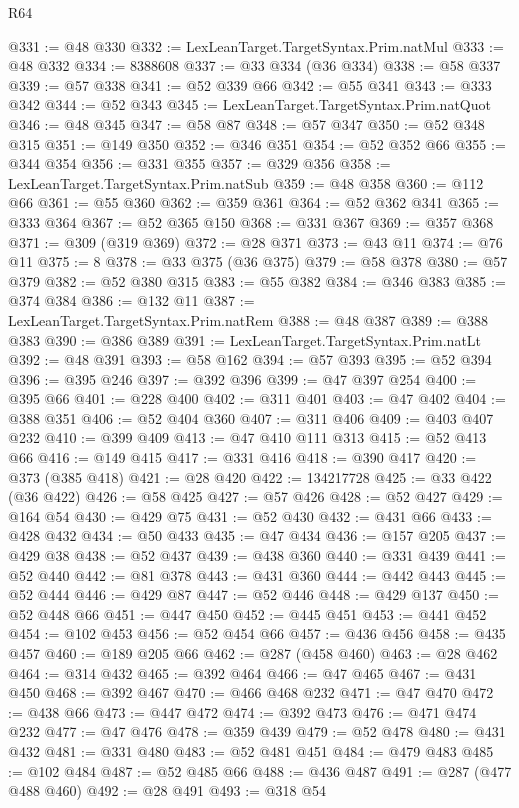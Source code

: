 \begin{lexlean}{R64}
\begin{coremodule}
@331 := @48 @330
@332 := LexLeanTarget.TargetSyntax.Prim.natMul
@333 := @48 @332
@334 := 8388608
@337 := @33 @334 (@36 @334)
@338 := @58 @337
@339 := @57 @338
@341 := @52 @339 @66
@342 := @55 @341
@343 := @333 @342
@344 := @52 @343
@345 := LexLeanTarget.TargetSyntax.Prim.natQuot
@346 := @48 @345
@347 := @58 @87
@348 := @57 @347
@350 := @52 @348 @315
@351 := @149 @350
@352 := @346 @351
@354 := @52 @352 @66
@355 := @344 @354
@356 := @331 @355
@357 := @329 @356
@358 := LexLeanTarget.TargetSyntax.Prim.natSub
@359 := @48 @358
@360 := @112 @66
@361 := @55 @360
@362 := @359 @361
@364 := @52 @362 @341
@365 := @333 @364
@367 := @52 @365 @150
@368 := @331 @367
@369 := @357 @368
@371 := @309 (@319 @369)
@372 := @28 @371
@373 := @43 @11
@374 := @76 @11
@375 := 8
@378 := @33 @375 (@36 @375)
@379 := @58 @378
@380 := @57 @379
@382 := @52 @380 @315
@383 := @55 @382
@384 := @346 @383
@385 := @374 @384
@386 := @132 @11
@387 := LexLeanTarget.TargetSyntax.Prim.natRem
@388 := @48 @387
@389 := @388 @383
@390 := @386 @389
@391 := LexLeanTarget.TargetSyntax.Prim.natLt
@392 := @48 @391
@393 := @58 @162
@394 := @57 @393
@395 := @52 @394
@396 := @395 @246
@397 := @392 @396
@399 := @47 @397 @254
@400 := @395 @66
@401 := @228 @400
@402 := @311 @401
@403 := @47 @402
@404 := @388 @351
@406 := @52 @404 @360
@407 := @311 @406
@409 := @403 @407 @232
@410 := @399 @409
@413 := @47 @410 @111 @313
@415 := @52 @413 @66
@416 := @149 @415
@417 := @331 @416
@418 := @390 @417
@420 := @373 (@385 @418)
@421 := @28 @420
@422 := 134217728
@425 := @33 @422 (@36 @422)
@426 := @58 @425
@427 := @57 @426
@428 := @52 @427
@429 := @164 @54
@430 := @429 @75
@431 := @52 @430
@432 := @431 @66
@433 := @428 @432
@434 := @50 @433
@435 := @47 @434
@436 := @157 @205
@437 := @429 @38
@438 := @52 @437
@439 := @438 @360
@440 := @331 @439
@441 := @52 @440
@442 := @81 @378
@443 := @431 @360
@444 := @442 @443
@445 := @52 @444
@446 := @429 @87
@447 := @52 @446
@448 := @429 @137
@450 := @52 @448 @66
@451 := @447 @450
@452 := @445 @451
@453 := @441 @452
@454 := @102 @453
@456 := @52 @454 @66
@457 := @436 @456
@458 := @435 @457
@460 := @189 @205 @66
@462 := @287 (@458 @460)
@463 := @28 @462
@464 := @314 @432
@465 := @392 @464
@466 := @47 @465
@467 := @431 @450
@468 := @392 @467
@470 := @466 @468 @232
@471 := @47 @470
@472 := @438 @66
@473 := @447 @472
@474 := @392 @473
@476 := @471 @474 @232
@477 := @47 @476
@478 := @359 @439
@479 := @52 @478
@480 := @431 @432
@481 := @331 @480
@483 := @52 @481 @451
@484 := @479 @483
@485 := @102 @484
@487 := @52 @485 @66
@488 := @436 @487
@491 := @287 (@477 @488 @460)
@492 := @28 @491
@493 := @318 @54

\end{coremodule}
\end{lexlean}

